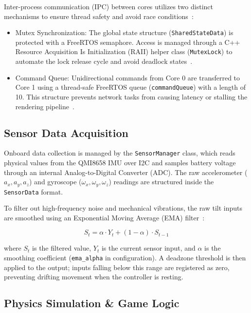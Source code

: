 Inter-process communication (IPC) between cores utilizes two distinct mechanisms to ensure thread safety and avoid race conditions~\cite{ipc2026}:

\begin{itemize}
    \item Mutex Synchronization: The global state structure (\texttt{SharedStateData}) is protected with a FreeRTOS semaphore. Access is managed through a C++ Resource Acquisition Is Initialization (RAII) helper class (\texttt{MutexLock}) to automate the lock release cycle and avoid deadlock states~\cite{cppreference2026raii}.
    \item Command Queue: Unidirectional commands from Core 0 are transferred to Core 1 using a thread-safe FreeRTOS queue (\texttt{commandQueue}) with a length of 10. This structure prevents network tasks from causing latency or stalling the rendering pipeline~\cite{freertos2026esp32}.
\end{itemize}

\subsection{Sensor Data Acquisition}
\label{subsec:sensor_data_acquisition}

Onboard data collection is managed by the \texttt{SensorManager} class, which reads physical values from the QMI8658 IMU over I2C and samples battery voltage through an internal Analog-to-Digital Converter (ADC). The raw accelerometer ($a_x, a_y, a_z$) and gyroscope ($\omega_x, \omega_y, \omega_z$) readings are structured inside the \texttt{SensorData} format.

To filter out high-frequency noise and mechanical vibrations, the raw tilt inputs are smoothed using an Exponential Moving Average (EMA) filter~\cite{klinker2011exponential}:

\begin{equation}
    S_t = \alpha \cdot Y_t + (1 - \alpha) \cdot S_{t-1}
\end{equation}

where $S_t$ is the filtered value, $Y_t$ is the current sensor input, and $\alpha$ is the smoothing coefficient (\texttt{ema\_alpha} in configuration).
A deadzone threshold is then applied to the output; inputs falling below this range are registered as zero, preventing drifting movement when the controller is resting.

\subsection{Physics Simulation \& Game Logic}
\label{subsec:physics_simulation_game_logic}

